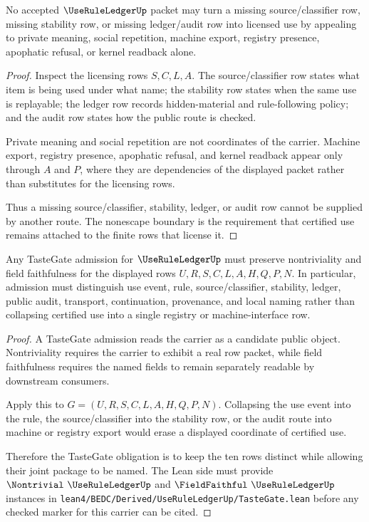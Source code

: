 \begin{theorem}
\label{thm:use-rule-ledger-nonescape-boundary}
No accepted $\UseRuleLedgerUp$ packet may turn a missing source/classifier row, missing stability row, or missing ledger/audit row into licensed use by appealing to private meaning, social repetition, machine export, registry presence, apophatic refusal, or kernel readback alone.
\end{theorem}
\begin{proof}
Inspect the licensing rows $S,C,L,A$. The source/classifier row states what item is being used under what name; the stability row states when the same use is replayable; the ledger row records hidden-material and rule-following policy; and the audit row states how the public route is checked.

Private meaning and social repetition are not coordinates of the carrier. Machine export, registry presence, apophatic refusal, and kernel readback appear only through $A$ and $P$, where they are dependencies of the displayed packet rather than substitutes for the licensing rows.

Thus a missing source/classifier, stability, ledger, or audit row cannot be supplied by another route. The nonescape boundary is the requirement that certified use remains attached to the finite rows that license it.
\end{proof}

\begin{theorem}
\label{thm:use-rule-ledger-tastegate-obligation}
Any TasteGate admission for $\UseRuleLedgerUp$ must preserve nontriviality and field faithfulness for the displayed rows $U,R,S,C,L,A,H,Q,P,N$. In particular, admission must distinguish use event, rule, source/classifier, stability, ledger, public audit, transport, continuation, provenance, and local naming rather than collapsing certified use into a single registry or machine-interface row.
\end{theorem}

\begin{proof}
A TasteGate admission reads the carrier as a candidate public object. Nontriviality requires the carrier to exhibit a real row packet, while field faithfulness requires the named fields to remain separately readable by downstream consumers.

Apply this to $G=(U,R,S,C,L,A,H,Q,P,N)$. Collapsing the use event into the rule, the source/classifier into the stability row, or the audit route into machine or registry export would erase a displayed coordinate of certified use.

Therefore the TasteGate obligation is to keep the ten rows distinct while allowing their joint package to be named. The Lean side must provide $\Nontrivial\ \UseRuleLedgerUp$ and $\FieldFaithful\ \UseRuleLedgerUp$ instances in \texttt{lean4/BEDC/Derived/UseRuleLedgerUp/TasteGate.lean} before any checked marker for this carrier can be cited.
\end{proof}

